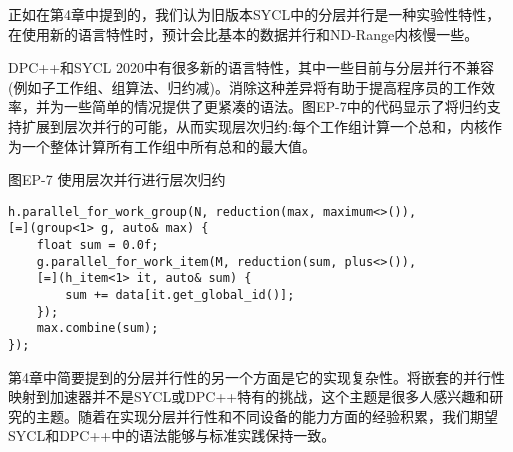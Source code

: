 正如在第4章中提到的，我们认为旧版本SYCL中的分层并行是一种实验性特性，在使用新的语言特性时，预计会比基本的数据并行和ND-Range内核慢一些。\par

DPC++和SYCL 2020中有很多新的语言特性，其中一些目前与分层并行不兼容(例如子工作组、组算法、归约减)。消除这种差异将有助于提高程序员的工作效率，并为一些简单的情况提供了更紧凑的语法。图EP-7中的代码显示了将归约支持扩展到层次并行的可能，从而实现层次归约:每个工作组计算一个总和，内核作为一个整体计算所有工作组中所有总和的最大值。\par

\hspace*{\fill} \par %
图EP-7 使用层次并行进行层次归约
\begin{lstlisting}[caption={}]
h.parallel_for_work_group(N, reduction(max, maximum<>()),
[=](group<1> g, auto& max) {
	float sum = 0.0f;
	g.parallel_for_work_item(M, reduction(sum, plus<>()),
	[=](h_item<1> it, auto& sum) {
		sum += data[it.get_global_id()];
	});
	max.combine(sum);
});
\end{lstlisting}

第4章中简要提到的分层并行性的另一个方面是它的实现复杂性。将嵌套的并行性映射到加速器并不是SYCL或DPC++特有的挑战，这个主题是很多人感兴趣和研究的主题。随着在实现分层并行性和不同设备的能力方面的经验积累，我们期望SYCL和DPC++中的语法能够与标准实践保持一致。\par
















































